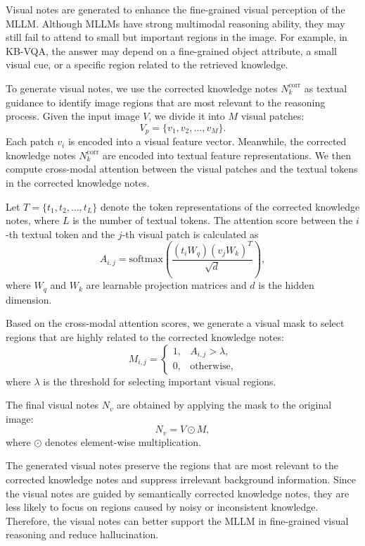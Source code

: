 \documentclass[manuscript,screen,review]{acmart}
\begin{document}
Visual notes are generated to enhance the fine-grained visual perception of the MLLM. Although MLLMs have strong multimodal reasoning ability, they may still fail to attend to small but important regions in the image. For example, in KB-VQA, the answer may depend on a fine-grained object attribute, a small visual cue, or a specific region related to the retrieved knowledge.

To generate visual notes, we use the corrected knowledge notes $N_k^{\text{corr}}$ as textual guidance to identify image regions that are most relevant to the reasoning process. Given the input image $V$, we divide it into $M$ visual patches:
\begin{equation}
V_p = \{v_1, v_2, \ldots, v_M\}.
\end{equation}
Each patch $v_i$ is encoded into a visual feature vector. Meanwhile, the corrected knowledge notes $N_k^{\text{corr}}$ are encoded into textual feature representations. We then compute cross-modal attention between the visual patches and the textual tokens in the corrected knowledge notes.

Let $T = \{t_1, t_2, \ldots, t_L\}$ denote the token representations of the corrected knowledge notes, where $L$ is the number of textual tokens. The attention score between the $i$-th textual token and the $j$-th visual patch is calculated as
\begin{equation}
A_{i,j} = \text{softmax}\left(\frac{(t_i W_q)(v_j W_k)^T}{\sqrt{d}}\right),
\end{equation}
where $W_q$ and $W_k$ are learnable projection matrices and $d$ is the hidden dimension.

Based on the cross-modal attention scores, we generate a visual mask to select regions that are highly related to the corrected knowledge notes:
\begin{equation}
M_{i,j} =
\begin{cases}
1, & A_{i,j} > \lambda, \\
0, & \text{otherwise},
\end{cases}
\end{equation}
where $\lambda$ is the threshold for selecting important visual regions.

The final visual notes $N_v$ are obtained by applying the mask to the original image:
\begin{equation}
N_v = V \odot M,
\end{equation}
where $\odot$ denotes element-wise multiplication.

The generated visual notes preserve the regions that are most relevant to the corrected knowledge notes and suppress irrelevant background information. Since the visual notes are guided by semantically corrected knowledge notes, they are less likely to focus on regions caused by noisy or inconsistent knowledge. Therefore, the visual notes can better support the MLLM in fine-grained visual reasoning and reduce hallucination.
\end{document}
